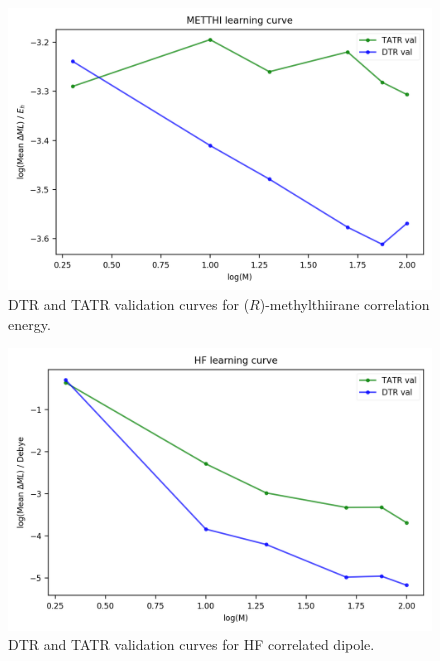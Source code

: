 \begin{figure}
    \centering
    \includegraphics[scale=1.0]{p2/figures/si/METTHI_learn_log_e.png}
    \caption{DTR and TATR validation curves for ($\textit{R}$)-methylthiirane correlation energy.}
\end{figure}

\begin{figure}
    \centering
    \includegraphics[scale=1.0]{p2/figures/si/HF_learn_log_d.png}
    \caption{DTR and TATR validation curves for HF correlated dipole.}
\end{figure}

